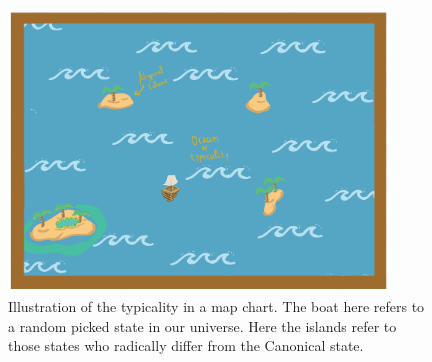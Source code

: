 \begin{figure}[h!]
\centering
\includegraphics[width=0.9\textwidth]{Figures/ocean-of-typicality.png}
\caption{Illustration of the typicality in a map chart. The boat here refers to a random picked state in our universe. Here the islands refer to those states who radically differ from the Canonical state.}
\end{figure}


